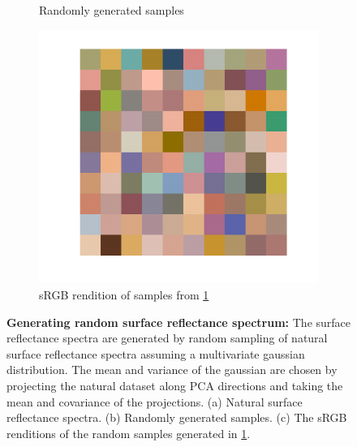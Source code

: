\documentclass{jov}
\begin{document}
\begin{figure}
\begin{subfigure}[b]{0.3\textwidth}
        \caption{Randomly generated samples}
        \label{fig:randomSurface}
    \end{subfigure}
    \begin{subfigure}[b]{0.3 \textwidth}
    \centering
        \includegraphics[width=\textwidth]{../Figures/Figure13/Figure13_c.pdf}
        \caption{sRGB rendition of samples from \ref{fig:randomSurface}}
        \label{fig:sRGBSurface}
    \end{subfigure}
    \caption{{\bf Generating random surface reflectance spectrum:} The surface reflectance spectra are generated by random sampling of natural surface reflectance spectra assuming a multivariate gaussian distribution. The mean and variance of the gaussian are chosen by projecting the natural dataset along PCA directions and taking the mean and covariance of the projections. (a) Natural surface reflectance spectra. (b) Randomly generated samples. (c) The sRGB renditions of the random samples generated in \ref{fig:randomSurface}.}\label{fig:surfaceReflectanceGeneration}
\end{figure}
\end{document}
